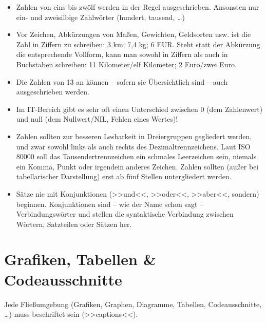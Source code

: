 \begin{itemize}
\item Zahlen von eins bis zwölf werden in der Regel ausgeschrieben. Ansonsten nur ein- und zweisilbige Zahlwörter (hundert, tausend, \ldots)
\item Vor Zeichen, Abkürzungen von Maßen, Gewichten, Geldsorten usw. ist die Zahl in Ziffern zu schreiben: 3 km; 7,4 kg; 6 EUR. Steht statt der Abkürzung die entsprechende Vollform, kann man sowohl in Ziffern als auch in Buchstaben schreiben: 11 Kilometer/elf Kilometer; 2 Euro/zwei Euro.
\item Die Zahlen von 13 an können -- sofern sie Übersichtlich sind -- auch ausgeschrieben werden.
\item Im IT-Bereich gibt es sehr oft einen Unterschied zwischen 0 (dem Zahlenwert) und null (dem Nullwert/NIL, Fehlen eines Wertes)!
\item Zahlen sollten zur besseren Lesbarkeit in Dreiergruppen gegliedert werden, und zwar sowohl links als auch rechts des Dezimaltrennzeichens. Laut ISO 80000 soll das Tausendertrennzeichen ein schmales Leerzeichen sein, niemals ein Komma, Punkt oder irgendein anderes Zeichen. Zahlen sollten (außer bei tabellarischer Darstellung) erst ab fünf Stellen untergliedert werden.
\item Sätze nie mit Konjunktionen (>>und<<, >>oder<<, >>aber<<, sondern) beginnen. Konjunktionen sind -- wie der Name schon sagt -- Verbindungswörter und stellen die syntaktische Verbindung zwischen Wörtern, Satzteilen oder Sätzen her.
\end{itemize}


\section{Grafiken, Tabellen \& Codeausschnitte}

Jede Fließumgebung (Grafiken, Graphen, Diagramme, Tabellen, Codeausschnitte, \ldots) muss beschriftet sein (>>captions<<).

